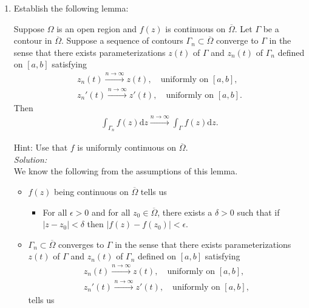 \documentclass[10pt]{amsart}
\newcommand{\D}{\mathrm{d}}
\theoremstyle{nonumberplain}
\begin{document}
\begin{enumerate}[label={\bf {\arabic*}:}]
\newpage
\item Establish the following lemma:\\
    \begin{lemma}
      Suppose $\Omega$ is an open region and $f(z)$ is continuous on
      $\overline \Omega$.  Let $\Gamma$ be a contour in $\overline
      \Omega$.  Suppose a sequence of contours $\Gamma_n \subset
      \overline \Omega$ converge to
      $\Gamma$ in the sense that there exists parameterizations $z(t)$
      of $\Gamma$ and $z_n(t)$ of $\Gamma_n$ defined on $[a,b]$
      satisfying
      \begin{align*}
        z_n(t) \overset{n \to \infty}{\longrightarrow} z(t),  \quad \text{
        uniformly on } [a,b],\\
        z_n'(t) \overset{n \to \infty}{\longrightarrow} z'(t), \quad \text{
        uniformly on } [a,b].
      \end{align*}
      Then
      \begin{align*}
        \int_{\Gamma_n} f(z) \D z \overset{n \to
        \infty}{\longrightarrow}   \int_{\Gamma} f(z) \D z.
      \end{align*}
    \end{lemma}
    Hint: Use that $f$ is uniformly continuous on $\overline \Omega$.\\
\textit{Solution:} \\
We know the following from the assumptions of this lemma.
\begin{itemize}
\item $f(z)$ being continuous on $\overline \Omega$ tells us
\begin{itemize}
\item For all $\epsilon > 0$ and for all $z_0 \in \overline \Omega$, there exists a $\delta > 0$ such that if $|z - z_0| < \delta$ then $|f(z) - f(z_0)| < \epsilon$.
\end{itemize}
\item $\Gamma_n \subset \overline \Omega$ converges to $\Gamma$ in the sense that there exists parameterizations $z(t)$
      of $\Gamma$ and $z_n(t)$ of $\Gamma_n$ defined on $[a,b]$
      satisfying
      \begin{align*}
        z_n(t) \overset{n \to \infty}{\longrightarrow} z(t),  \quad \text{
        uniformly on } [a,b],\\
        z_n'(t) \overset{n \to \infty}{\longrightarrow} z'(t), \quad \text{
        uniformly on } [a,b],
      \end{align*}
tells us
\begin{itemize}

\end{itemize}
\end{itemize}
\end{enumerate}
\end{document}

